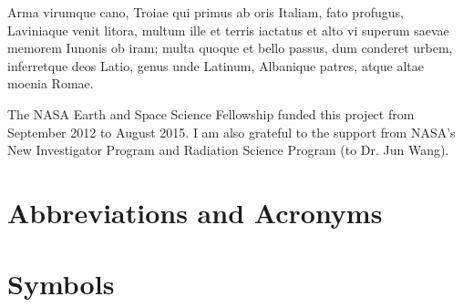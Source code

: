 \documentclass[phd, print]{nuthesis}
\begin{document}
\begin{acknowledgments}
  Arma virumque cano, Troiae qui primus ab oris Italiam, fato
  profugus, Laviniaque venit litora, multum ille et terris iactatus et
  alto vi superum saevae memorem Iunonis ob iram; multa quoque et
  bello passus, dum conderet urbem, inferretque deos Latio, genus unde
  Latinum, Albanique patres, atque altae moenia Romae.
\end{acknowledgments}

\begin{grantinfo}
  The NASA Earth and Space Science Fellowship funded this project from September 
  2012 to August 2015. I am also grateful to the support from NASA's New Investigator 
  Program and Radiation Science Program (to Dr. Jun Wang).
\end{grantinfo}

\tableofcontents
\begin{onehalfspacing}
\listoffigures
\listoftables
\end{onehalfspacing}

\mainmatter



\backmatter

\appendix

\chapter{Abbreviations and Acronyms}
\chapter{Symbols}

\begin{onehalfspacing}


\end{onehalfspacing}

\end{document}

